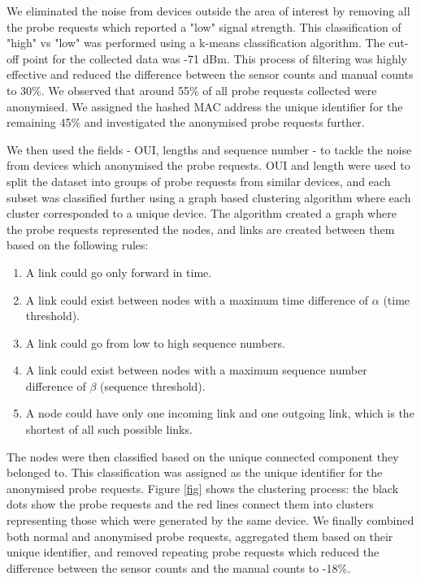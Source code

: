 \documentclass[11t, a4paper, twocolumn]{article}
\begin{document}
	We eliminated the noise from devices outside the area of interest by removing all the probe requests which reported a "low" signal strength. This classification of "high" vs "low" was performed using a k-means classification algorithm. The cut-off point for the collected data was -71 dBm. This process of filtering was highly effective and reduced the difference between the sensor counts and manual counts to 30\%. We observed that around 55\% of all probe requests collected were anonymised. We assigned the hashed MAC address the unique identifier for the remaining 45\% and investigated the anonymised probe requests further.

	We then used the fields - OUI, lengths and sequence number - to tackle the noise from devices which anonymised the probe requests. OUI and length were used to split the dataset into groups of probe requests from similar devices, and each subset was classified further using a graph based clustering algorithm where each cluster corresponded to a unique device. The algorithm created a graph where the probe requests represented the nodes, and links are created between them based on the following rules: 
		
	\begin{enumerate}
		\item A link could go only forward in time. 
		\item A link could exist between nodes with a maximum time difference of $\alpha$ (time threshold).
		\item A link could go from low to high sequence numbers.
		\item A link could exist between nodes with a maximum sequence number difference of $\beta$ (sequence threshold).
		\item A node could have only one incoming link and one outgoing link, which is the shortest of all such possible links.
	\end{enumerate}

	The nodes were then classified based on the unique connected component they belonged to. This classification was assigned as the unique identifier for the anonymised probe requests. Figure \ref{fig} shows the clustering process: the black dots show the probe requests and the red lines connect them into clusters representing those which were generated by the same device. We finally combined both normal and anonymised probe requests, aggregated them based on their unique identifier, and removed repeating probe requests which reduced the difference between the sensor counts and the manual counts to -18\%.
\end{document}
